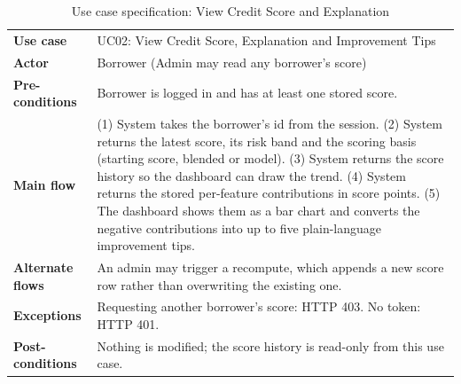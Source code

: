 \documentclass[11pt,a4paper]{article}
\begin{document}
\begin{table}[H]
\centering
\caption{Use case specification: View Credit Score and Explanation}
\label{tab:uc2}
\small
\begin{tabular}{@{}L{3.1cm}L{11.3cm}@{}}
\toprule
\textbf{Use case} & UC02: View Credit Score, Explanation and Improvement Tips\\
\textbf{Actor} & Borrower (Admin may read any borrower's score)\\
\textbf{Pre-conditions} & Borrower is logged in and has at least one stored score.\\
\textbf{Main flow} & (1) System takes the borrower's id from the session. (2) System returns the latest score, its risk band and the scoring basis (starting score, blended or model). (3) System returns the score history so the dashboard can draw the trend. (4) System returns the stored per-feature contributions in score points. (5) The dashboard shows them as a bar chart and converts the negative contributions into up to five plain-language improvement tips.\\
\textbf{Alternate flows} & An admin may trigger a recompute, which appends a new score row rather than overwriting the existing one.\\
\textbf{Exceptions} & Requesting another borrower's score: HTTP 403. No token: HTTP 401.\\
\textbf{Post-conditions} & Nothing is modified; the score history is read-only from this use case.\\
\bottomrule
\end{tabular}
\end{table}
\end{document}
